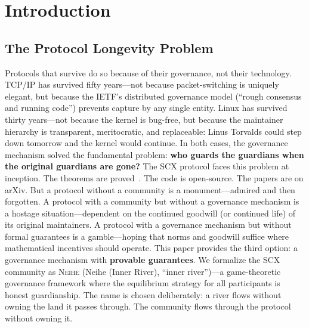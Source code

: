\documentclass[12pt,a4paper]{article}
\theoremstyle{definition}
\newcommand{\Neihe}{\textsc{Neihe}}
\begin{document}
\section{Introduction}
\subsection{The Protocol Longevity Problem}
Protocols that survive do so because of their governance, not their technology. TCP/IP has survived fifty years---not because packet-switching is uniquely elegant, but because the IETF's distributed governance model (``rough consensus and running code'') prevents capture by any single entity. Linux has survived thirty years---not because the kernel is bug-free, but because the maintainer hierarchy is transparent, meritocratic, and replaceable: Linus Torvalds could step down tomorrow and the kernel would continue. In both cases, the governance mechanism solved the fundamental problem: \textbf{who guards the guardians when the original guardians are gone?}
The SCX protocol faces this problem at inception. The theorems are proved~\cite{SCX2025,SCXTheory2026}. The code is open-source. The papers are on arXiv. But a protocol without a community is a monument---admired and then forgotten. A protocol with a community but without a governance mechanism is a hostage situation---dependent on the continued goodwill (or continued life) of its original maintainers. A protocol with a governance mechanism but without formal guarantees is a gamble---hoping that norms and goodwill suffice where mathematical incentives should operate.
This paper provides the third option: a governance mechanism with \textbf{provable guarantees}. We formalize the SCX community as \Neihe{} (Neihe (Inner River), ``inner river'')---a game-theoretic governance framework where the equilibrium strategy for all participants is honest guardianship. The name is chosen deliberately: a river flows without owning the land it passes through. The community flows through the protocol without owning it.
\end{document}
